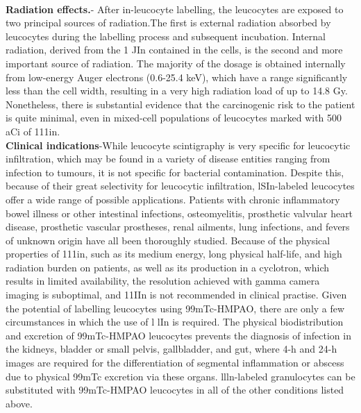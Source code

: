 \documentclass[12pt]{article}
\begin{document}
\\\textbf{Radiation effects.}- After in-leucocyte labelling, the leucocytes are exposed to two principal sources of radiation.The first is external radiation absorbed by leucocytes during the labelling process and subsequent incubation. Internal radiation, derived from the 1 JIn contained in the cells, is the second and more important source of radiation. The majority of the dosage is obtained internally from low-energy Auger electrons (0.6-25.4 keV), which have a range significantly less than the cell width, resulting in a very high radiation load of up to 14.8 Gy. Nonetheless, there is substantial evidence that the carcinogenic risk to the patient is quite minimal, even in mixed-cell populations of leucocytes marked with 500 aCi of 111in.
\\\textbf{Clinical indications}-While leucocyte scintigraphy is very specific for leucocytic infiltration, which may be found in a variety of disease entities ranging from infection to tumours, it is not specific for bacterial contamination. Despite this, because of their great selectivity for leucocytic infiltration, lSIn-labeled leucocytes offer a wide range of possible applications. Patients with chronic inflammatory bowel illness or other intestinal infections, osteomyelitis, prosthetic valvular heart disease, prosthetic vascular prostheses, renal ailments, lung infections, and fevers of unknown origin have all been thoroughly studied.
Because of the physical properties of 111in, such as its medium energy, long physical half-life, and high radiation burden on patients, as well as its production in a cyclotron, which results in limited availability, the resolution achieved with gamma camera imaging is suboptimal, and 11IIn is not recommended in clinical practise. Given the potential of labelling leucocytes using 99mTc-HMPAO, there are only a few circumstances in which the use of l lIn is required. The physical biodistribution and excretion of 99mTc-HMPAO leucocytes prevents the diagnosis of infection in the kidneys, bladder or small pelvis, gallbladder, and gut, where 4-h and 24-h images are required for the differentiation of segmental inflammation or abscess due to physical 99mTc excretion via these organs. llln-labeled granulocytes can be substituted with 99mTc-HMPAO leucocytes in all of the other conditions listed above.
\end{document}
